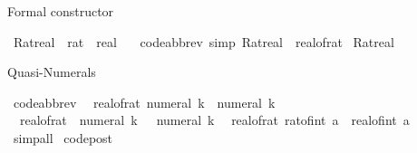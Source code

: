 \begin{isabellebody}
\endisatagproof
{\isafoldproof}%
%
\isadelimproof
%
\endisadelimproof
%
\isadelimdocument
%
\endisadelimdocument
%
\isatagdocument
%
\isamarkuptrue%
%
\endisatagdocument
{\isafolddocument}%
%
\isadelimdocument
%
\endisadelimdocument
%
\begin{isamarkuptext}%
Formal constructor%
\end{isamarkuptext}\isamarkuptrue%
\isamarkupfalse%
\ Ratreal\ {\isacharcolon}{\kern0pt}{\isacharcolon}{\kern0pt}\ {\isachardoublequoteopen}rat\ {\isasymRightarrow}\ real{\isachardoublequoteclose}\isanewline
\ \ \ {\isacharbrackleft}{\kern0pt}code{\isacharunderscore}{\kern0pt}abbrev{\isacharcomma}{\kern0pt}\ simp{\isacharbrackright}{\kern0pt}{\isacharcolon}{\kern0pt}\ {\isachardoublequoteopen}Ratreal\ {\isacharequal}{\kern0pt}\ real{\isacharunderscore}{\kern0pt}of{\isacharunderscore}{\kern0pt}rat{\isachardoublequoteclose}\isanewline
\isanewline
{}\isamarkupfalse%
\ Ratreal%
\begin{isamarkuptext}%
Quasi-Numerals%
\end{isamarkuptext}\isamarkuptrue%
\isamarkupfalse%
\ {\isacharbrackleft}{\kern0pt}code{\isacharunderscore}{\kern0pt}abbrev{\isacharbrackright}{\kern0pt}{\isacharcolon}{\kern0pt}\isanewline
\ \ {\isachardoublequoteopen}real{\isacharunderscore}{\kern0pt}of{\isacharunderscore}{\kern0pt}rat\ {\isacharparenleft}{\kern0pt}numeral\ k{\isacharparenright}{\kern0pt}\ {\isacharequal}{\kern0pt}\ numeral\ k{\isachardoublequoteclose}\isanewline
\ \ {\isachardoublequoteopen}real{\isacharunderscore}{\kern0pt}of{\isacharunderscore}{\kern0pt}rat\ {\isacharparenleft}{\kern0pt}{\isacharminus}{\kern0pt}\ numeral\ k{\isacharparenright}{\kern0pt}\ {\isacharequal}{\kern0pt}\ {\isacharminus}{\kern0pt}\ numeral\ k{\isachardoublequoteclose}\isanewline
\ \ {\isachardoublequoteopen}real{\isacharunderscore}{\kern0pt}of{\isacharunderscore}{\kern0pt}rat\ {\isacharparenleft}{\kern0pt}rat{\isacharunderscore}{\kern0pt}of{\isacharunderscore}{\kern0pt}int\ a{\isacharparenright}{\kern0pt}\ {\isacharequal}{\kern0pt}\ real{\isacharunderscore}{\kern0pt}of{\isacharunderscore}{\kern0pt}int\ a{\isachardoublequoteclose}\isanewline
%
\isadelimproof
\ \ %
\endisadelimproof
%
\isatagproof
{}\isamarkupfalse%
\ simp{\isacharunderscore}{\kern0pt}all%
\endisatagproof
{\isafoldproof}%
%
\isadelimproof
\isanewline
%
\endisadelimproof
\isanewline
{}\isamarkupfalse%
\ {\isacharbrackleft}{\kern0pt}code{\isacharunderscore}{\kern0pt}post{\isacharbrackright}{\kern0pt}{\isacharcolon}{\kern0pt}\isanewline

\end{isabellebody}
